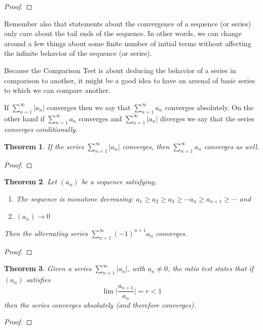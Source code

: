 \documentclass{tufte-book}
\newtheorem{theorem}{Theorem}[chapter]
\theoremstyle{definition}
\numberwithin{section}{chapter}
\begin{document}
	
	
	\begin{proof}  \end{proof}
	
	Remember also that statements about the convergence of a sequence (or series) only care about the tail ends of the sequence.  In other words, we can change around a few things about some finite number of initial terms without affecting the infinite behavior of the sequence (or series).
	
	Because the Comparison Test is about deducing the behavior of a series in comparison to another, it might be a good idea to have an arsenal of basic series to which we can compare another. 
	
	  If $\sum_{n=1}^{\infty} |a_n|$ converges then we say that $\sum_{n=1}^{\infty} a_n$ converges absolutely.  On the other hand if $\sum_{n=1}^{\infty} a_n$ converges and $\sum_{n=1}^{\infty} |a_n|$ diverges we say that the series \emph{converges conditionally}.
	
	
	\begin{theorem}
	If the series $\sum_{n=1}^{\infty} |a_n|$ converges, then $\sum_{n=1}^{\infty} a_n$ converges as well.
	\end{theorem}  
	\begin{proof}  \end{proof}
	
	
	\begin{theorem}  Let $(a_n)$ be a sequence satisfying,
	
	\begin{enumerate}
		\item The sequence is monotone decreasing:  $a_1 \geq a_2 \geq a_3 \geq \cdots a_n \geq a_{n+1} \geq \cdots $ and
		\item $(a_n) \to 0$
	\end{enumerate}
	
	
	Then the alternating series $\sum_{n=1}^{\infty} (-1)^{n+1} a_n$ converges.
	\end{theorem}
	\begin{proof}  \end{proof}
	
	\begin{theorem}
	Given a series $\sum_{n=1}^{\infty} |a_n|$, with $a_n \neq 0$, the ratio test states that if $(a_n)$ satisfies 
	\[		\lim \big|\frac{a_{n+1}}{a_n}	\big| = r < 1\]
	then the series converges absolutely (and therefore converges).
	\end{theorem} 
	\begin{proof}  \end{proof}
	
\end{document}
